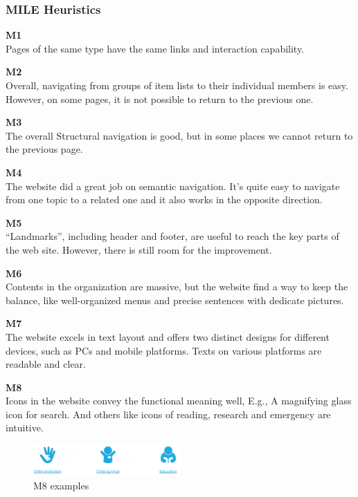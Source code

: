 \subsubsection{MILE Heuristics}
\begin{description}
\item {\textbf{M1} \color{unicefGray}{Interaction consistency}}\\
Pages of the same type have the same links and interaction capability.

\item {\textbf{M2} \color{unicefGray}{Group navigation}}\\
Overall, navigating from groups of item lists to their individual members is easy. However, on some pages, it is not possible to return to the previous one.

\item {\textbf{M3} \color{unicefGray}{Navigation support}}\\
The overall Structural navigation is good, but in some places we cannot return to the previous page.

\item {\textbf{M4} \color{unicefGray}{User control}}\\
The website did a great job on semantic navigation. It's quite easy to navigate from one topic to a related one and it also works in the opposite direction.

\item {\textbf{M5} \color{unicefGray}{Error prevention}}\\
“Landmarks”, including header and footer, are useful to reach the key parts of the web site. However, there is still room for the improvement.

\item {\textbf{M6} \color{unicefGray}{Information overload}}\\
 Contents in the organization are massive, but the website find a way to keep the balance, like well-organized menus and precise sentences with dedicate pictures.

\item {\textbf{M7} \color{unicefGray}{Text layout}}\\
The website excels in text layout and offers two distinct designs for different devices, such as PCs and mobile platforms. Texts on various platforms are readable and clear.

\item {\textbf{M8} \color{unicefGray}{Interaction placeholder semiotics}}\\
Icons in the website convey the functional meaning well, E.g.,  A magnifying glass icon for search. And others like icons of reading, research and emergency are intuitive.
\begin{figure}[H]
	\centering
	\includegraphics[width=0.5\textwidth]{Images/yan_m8.png}
	\caption{M8 examples}
	\label{fig:m8}
\end{figure}


\end{description}
